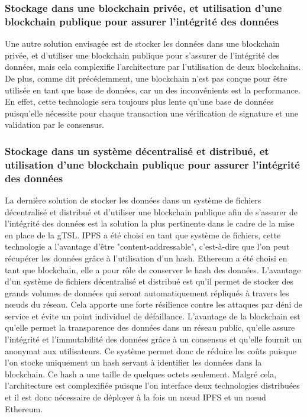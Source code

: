 \documentclass{tnreport}
\begin{document}
\subsubsection{Stockage dans une blockchain privée, et utilisation d'une blockchain publique pour assurer l'intégrité des données}

Une autre solution envisagée est de stocker les données dans une blockchain privée, et d'utiliser une blockchain publique pour s'assurer de l'intégrité des données, mais cela complexifie l'architecture par l'utilisation de deux blockchains. De plus, comme dit précédemment, une blockchain n'est pas conçue pour être utilisée en tant que base de données, car un des inconvénients est la performance. En effet, cette technologie sera toujours plus lente qu'une base de données puisqu'elle nécessite pour chaque transaction une vérification de signature et une validation par le consensus. 

\subsubsection{Stockage dans un système décentralisé et distribué, et utilisation d'une blockchain publique pour assurer l'intégrité des données}

La dernière solution de stocker les données dans un système de fichiers décentralisé et distribué et d'utiliser une blockchain publique afin de s'assurer de l'intégrité des données est la solution la plus pertinente dans le cadre de la mise en place de la gTSL. 
IPFS a été choisi en tant que système de fichiers, cette technologie a l'avantage d'être "content-addressable", c'est-à-dire que l'on peut récupérer les données grâce à l'utilisation d'un hash.
Ethereum a été choisi en tant que blockchain, elle a pour rôle de conserver le hash des données.
L'avantage d'un système de fichiers décentralisé et distribué est qu'il permet de stocker des grands volumes de données qui seront automatiquement répliqués à travers les nœuds du réseau. Cela apporte une forte résilience contre les attaques par déni de service et évite un point individuel de défaillance.
L'avantage de la blockchain est qu'elle permet la transparence des données dans un réseau public, qu'elle assure l'intégrité et l'immutabilité des données grâce à un consensus et qu'elle fournit un anonymat aux utilisateurs.
Ce système permet donc de réduire les coûts puisque l'on stocke uniquement un hash servant à identifier les données dans la blockchain. Ce hash a une taille de quelques octets seulement.
Malgré cela, l'architecture est complexifiée puisque l'on interface deux technologies distribuées et il est donc nécessaire de déployer à la fois un nœud IPFS et un nœud Ethereum.
\end{document}
